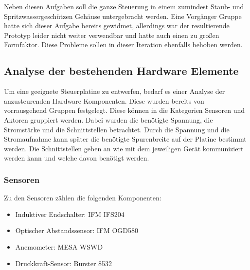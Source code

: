 \noindent Neben diesen Aufgaben soll die ganze Steuerung in einem zumindest Staub- und Spritzwassergeschützen Gehäuse untergebracht werden. Eine Vorgänger Gruppe hatte sich dieser Aufgabe bereits gewidmet, allerdings war der resultierende Prototyp leider nicht weiter verwendbar und hatte auch einen zu großen Formfaktor. Diese Probleme sollen in dieser Iteration ebenfalls behoben werden.

%

\label{Analyze_der_Aktoren_und_Sensoren}
\subsection{Analyse der bestehenden Hardware Elemente}
Um eine geeignete Steuerplatine zu entwerfen, bedarf es einer Analyse der anzusteurenden Hardware Komponenten. Diese wurden bereits von vorrausgehend Gruppen festgelegt. Diese können in die Kategorien Sensoren und Aktoren gruppiert werden. Dabei wurden die benötigte Spannung, die Stromstärke und die Schnittstellen betrachtet. Durch die Spannung und die Stromaufnahme kann später die benötigte Spurenbreite auf der Platine bestimmt werden. Die Schnittstellen geben an wie mit dem jeweiligen Gerät kommuniziert werden kann und welche davon benötigt werden.\\

\subsubsection{Sensoren}
Zu den Sensoren zählen die folgenden Komponenten:
\begin{itemize}
	\item Induktiver Endschalter: IFM IFS204
	\item Optischer Abstandssensor: IFM OGD580
	\item Anemometer: MESA WSWD
	\item Druckkraft-Sensor: Burster 8532
\end{itemize}

